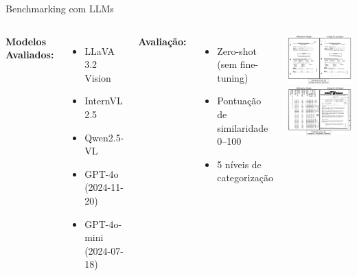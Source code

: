\begin{frame}{Benchmarking com LLMs}
\begin{columns}
\textbf{Modelos Avaliados:}
\begin{itemize}
    \item LLaVA 3.2 Vision
    \item InternVL 2.5
    \item Qwen2.5-VL
    \item GPT-4o (2024-11-20)
    \item GPT-4o-mini (2024-07-18)
\end{itemize}

\textbf{Avaliação:}
\begin{itemize}
    \item Zero-shot (sem fine-tuning)
    \item Pontuação de similaridade 0--100
    \item 5 níveis de categorização
\end{itemize}

\includegraphics[width=\textwidth]{images/similar.png}
\vspace{0.2cm}
\includegraphics[width=\textwidth]{images/different.png}
\end{columns}
\end{frame}
